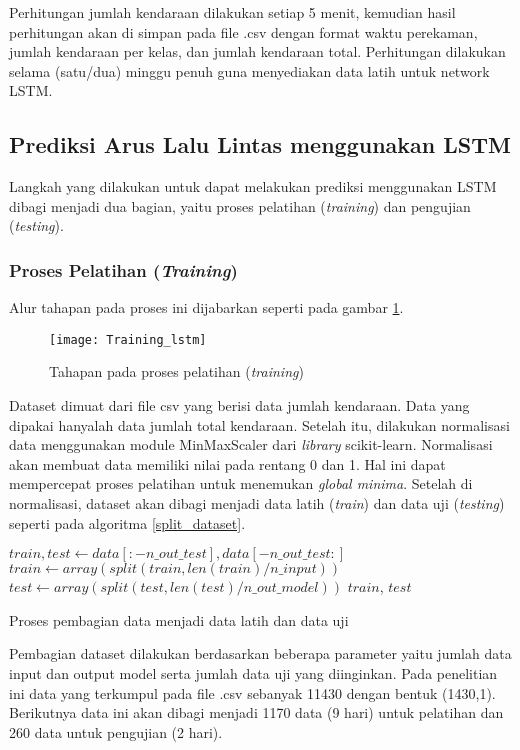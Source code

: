 \documentclass[../thesis.tex]{subfiles}
\begin{document}
Perhitungan jumlah kendaraan dilakukan setiap 5 menit, kemudian hasil perhitungan akan di simpan pada file .csv dengan format waktu perekaman, jumlah kendaraan per kelas, dan jumlah kendaraan total. Perhitungan dilakukan selama (satu/dua) minggu penuh guna menyediakan data latih untuk network LSTM.  

\subsection{Prediksi Arus Lalu Lintas menggunakan LSTM}
Langkah yang dilakukan untuk dapat melakukan prediksi menggunakan LSTM dibagi menjadi dua bagian, yaitu proses pelatihan (\textit{training}) dan pengujian (\textit{testing}).

\subsubsection{Proses Pelatihan (\textit{Training})}
Alur tahapan pada proses ini dijabarkan seperti pada gambar \ref{lstm_training}.
\begin{figure}
	\centering
	\texttt{[image: Training\_lstm]}
	\caption{Tahapan pada proses pelatihan (\textit{training})}
	\label{lstm_training}
\end{figure}
Dataset dimuat dari file csv yang berisi data jumlah kendaraan. Data yang dipakai hanyalah data jumlah total kendaraan. Setelah itu, dilakukan normalisasi data menggunakan module MinMaxScaler dari \textit{library} scikit-learn. Normalisasi akan membuat data memiliki nilai pada rentang 0 dan 1. Hal ini dapat mempercepat proses pelatihan untuk menemukan \textit{global minima}.
Setelah di normalisasi, dataset akan dibagi menjadi data latih (\textit{train}) dan data uji (\textit{testing}) seperti pada algoritma \ref{split_dataset}.
\begin{algorithm}[htp]
	\begin{algorithmic}[1]
		\State $train, test \leftarrow data[:-n\_out\_test], data[-n\_out\_test:]$
		\State $train \leftarrow array(split(train, len(train)/n\_input))$
		\State $test \leftarrow array(split(test, len(test)/n\_out\_model))$
		\Return $train$, $test$
	\EndFunction
	\end{algorithmic}
	\caption{Proses pembagian data menjadi data latih dan data uji}
	\label{split_dataset}
\end{algorithm}
Pembagian dataset dilakukan berdasarkan beberapa parameter yaitu jumlah data input dan output model serta jumlah data uji yang diinginkan. Pada penelitian ini data yang terkumpul pada file .csv sebanyak 11430 dengan bentuk (1430,1). Berikutnya data ini akan dibagi menjadi 1170 data (9 hari) untuk pelatihan dan 260 data untuk pengujian (2 hari). 
\end{document}
